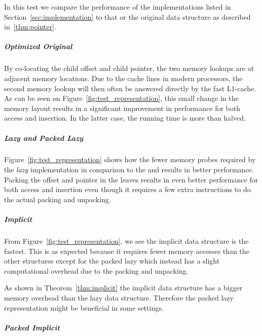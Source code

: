 In this test we compare the performance
of the implementations listed in Section~\ref{sec:implementation} to that 
or the original data structure as described in~\ref{thm:pointer}.

\subparagraph*{Optimized Original}
By co-locating the child offset and child pointer, the two memory lookups are at
adjacent memory locations. Due to the cache lines in modern processors,
the second memory lookup will then often be answered directly by the fast
L1-cache.
As can be seen on Figure~\ref{fig:test_representation}, this small change in the memory layout results in a significant improvement in performance for both access and insertion. In the latter case, the running time is more than halved.

\subparagraph*{Lazy and Packed Lazy}

Figure~\ref{fig:test_representation} shows
how the fewer memory probes required by the
\textit{lazy} implementation in comparison to the 
and  results in better performance.
Packing the offset and pointer in the leaves results in even better performance
for both access and insertion even though it requires a few extra instructions
to do the actual packing and unpacking.

\subparagraph*{Implicit}
From Figure~\ref{fig:test_representation}, we see the implicit
data structure is the fastest.
This is as expected because it requires fewer
memory accesses than the other structures except
for the packed lazy which instead has a slight
computational overhead due to the packing and unpacking.

As shown in Theorem~\ref{thm:implicit} the implicit data structure has a
bigger memory overhead than the lazy data structure.
Therefore the packed lazy representation might be beneficial in some
settings.

\subparagraph*{Packed Implicit}

